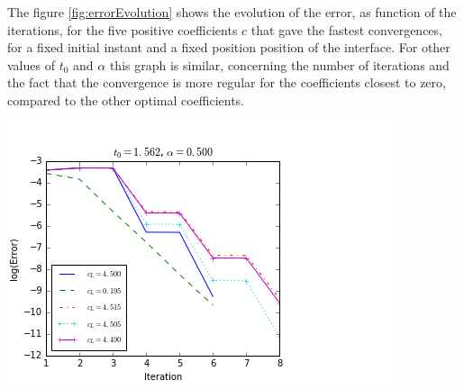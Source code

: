 
\indent The figure \ref{fig:errorEvolution} shows the evolution of the error, as function of the iterations, for the five positive coefficients $c$ that gave the fastest convergences, for a fixed initial instant and a fixed position position of the interface. For other values of $t_0$ and $\alpha$ this graph is similar, concerning the number of iterations and the fact that the convergence is more regular for the coefficients closest to zero, compared to the other optimal coefficients.

\begingroup
\begin{center}
\includegraphics[scale=.6]{figures/FinalFigures/errorEvolutionFixedT0CFinalVersionOnlyPositive.png}
\end{center}
\endgroup

